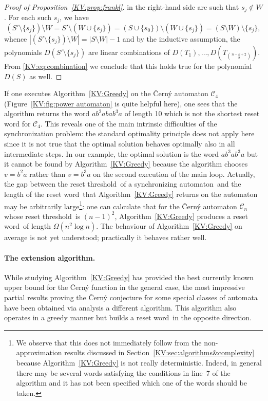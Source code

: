 \documentclass{irmaart}
\newcommand{\san}{synchronizing au\-tom\-a\-ton}
\newcommand{\sw}{reset word}
\newcommand{\rt}{reset threshold}
\theoremstyle{plain}
\begin{document}
\begin{proof}[Proof of Proposition~\ref{KV:prop:frankl}]
in the right-hand side are such that $s_j\notin W$. For each such $s_j$, we
have
\begin{displaymath}
(S'\setminus\{s_j\})\setminus
W=S'\setminus(W\cup\{s_j\})=(S\cup\{s_0\})\setminus(W\cup\{s_j\})=(S\setminus
W)\setminus\{s_j\},
\end{displaymath}
whence $|(S'\setminus\{s_j\})\setminus W|=|S\setminus W|-1$ and by the
inductive assumption, the polynomials $D(S'\setminus\{s_j\})$ are linear
combinations of $D(T_1),\dots,D(T_{\binom{n-k+2}2})$. From
\eqref{KV:eq:combination} we conclude that this holds true for the polynomial
$D(S)$ as well.
\end{proof}

If one executes Algorithm~\ref{KV:Greedy} on the \v{C}ern\'{y} automaton
$\mathcal{C}_{4}$ (Figure~\ref{KV:fig:power automaton} is quite helpful here),
one sees that the algorithm returns the word $ab^2abab^3a$ of length 10 which
is not the shortest reset word for $\mathcal{C}_{4}$. This reveals one of the
main intrinsic difficulties of the synchronization problem: the standard
optimality principle does not apply here since it is not true that the optimal
solution behaves optimally also in all intermediate steps. In our example, the
optimal solution is the word $ab^3ab^3a$ but it cannot be found by
Algorithm~\ref{KV:Greedy} because the algorithm chooses $v=b^2a$ rather than
$v=b^3a$ on the second execution of the main loop. Actually, the gap between
the \rt\ of a \san\ and the length of the \sw\ that Algorithm~\ref{KV:Greedy}
returns on the automaton may be arbitrarily large\footnote{We observe that this
does not immediately follow from the non-approximation results discussed in
Section~\ref{KV:sec:algorithms&complexity} because Algorithm~\ref{KV:Greedy} is
not really deterministic. Indeed, in general there may be several words
satisfying the conditions in line~7 of the algorithm and it has not been
specified which one of the words should be taken.}: one can calculate that for
the \v{C}ern\'{y} automaton $\mathcal{C}_{n}$ whose \rt\ is $(n-1)^2$,
Algorithm~\ref{KV:Greedy} produces a \sw\ of length $\Omega(n^2\log n)$. The
behaviour of Algorithm~\ref{KV:Greedy} on average is not yet understood;
practically it behaves rather well.

\paragraph*{The extension algorithm.} While studying Algorithm~\ref{KV:Greedy}
has provided the best currently known upper bound for the \v{C}ern\'{y}
function in the general case, the most impressive partial results proving the
\v{C}ern\'{y} conjecture for some special classes of automata have been
obtained via analysis a different algorithm. This algorithm also operates in a
greedy manner but builds a \sw\ in the opposite direction.
\end{document}
